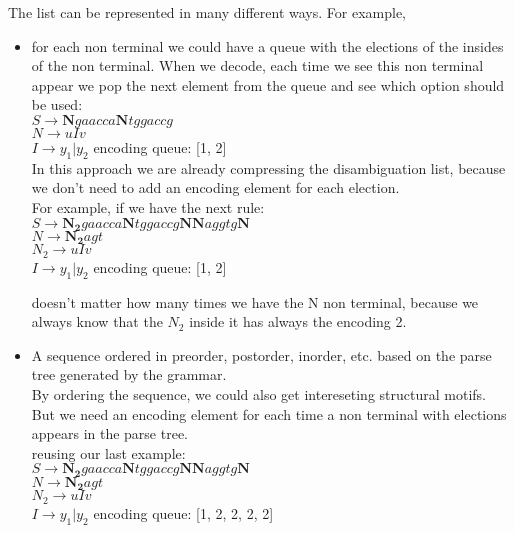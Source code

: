 	The list can be represented in many different ways. For example, 
	\begin{itemize}
		\item for each non terminal we could have a queue with the elections of the 
		insides of the non terminal. When we decode, each time we see this non terminal appear
		we pop the next element from the queue and see which option should be used: \\


	$S \rightarrow \textbf{N}gaacca\textbf{N}tggaccg$\\
	$N \rightarrow u I v$ \\
	$I \rightarrow y_1 | y_2$  encoding queue: [1, 2] \\

	In this approach we are already compressing the disambiguation list, because we don't
	need to add an encoding element for each election. \\
	For example, if we have the next rule:\\

	$S \rightarrow \bm{N_2}gaacca\textbf{N}tggaccg\textbf{N}\textbf{N}aggtg\textbf{N}$\\
	$N \rightarrow \bm{N_2} agt$ \\
	$N_2 \rightarrow uIv$\\
	$I \rightarrow y_1 | y_2$  encoding queue: [1, 2]

	doesn't matter how many times we have the N non terminal, because we always know
	that the $N_2$ inside it has always the encoding 2.


		\item A sequence ordered in preorder, postorder, inorder, etc. based on the parse
		tree generated by the grammar. \\

		By ordering the sequence, we could also get intereseting structural motifs. But
		we need an encoding element for each time a non terminal with elections appears
		in the parse tree. \\

		reusing our last example: \\

		$S \rightarrow \bm{N_2}gaacca\textbf{N}tggaccg\textbf{N}\textbf{N}aggtg\textbf{N}$\\
		$N \rightarrow \bm{N_2} agt$ \\
		$N_2 \rightarrow uIv$\\
		$I \rightarrow y_1 | y_2$  encoding queue: [1, 2, 2, 2, 2]

	\end{itemize}



